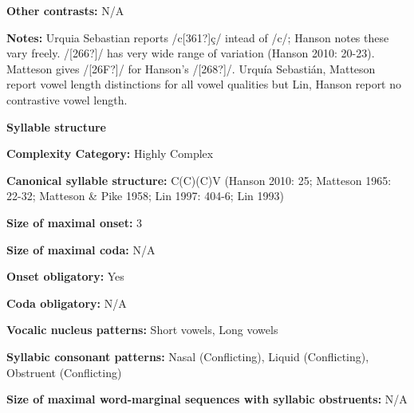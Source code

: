 \begin{styleBody}
\textbf{Other contrasts:} N/A
\end{styleBody}

\begin{styleBody}
\textbf{Notes:} Urquia Sebastian reports /c[361?]ç/ intead of /c/; Hanson notes these vary freely. /[266?]/ has very wide range of variation (Hanson 2010: 20-23). Matteson gives /[26F?]/ for Hanson’s /[268?]/. Urquía Sebastián, Matteson report vowel length distinctions for all vowel qualities but Lin, Hanson report no contrastive vowel length.
\end{styleBody}

\begin{styleBody}
\textbf{Syllable structure}
\end{styleBody}

\begin{styleBody}
\textbf{Complexity Category:} Highly Complex
\end{styleBody}

\begin{styleBody}
\textbf{Canonical syllable structure:} C(C)(C)V\textbf{ }(Hanson 2010: 25; Matteson 1965: 22-32; Matteson \& Pike 1958; Lin 1997: 404-6; Lin 1993)
\end{styleBody}

\begin{styleBody}
\textbf{Size of maximal onset:} 3
\end{styleBody}

\begin{styleBody}
\textbf{Size of maximal coda:} N/A
\end{styleBody}

\begin{styleBody}
\textbf{Onset obligatory:} Yes
\end{styleBody}

\begin{styleBody}
\textbf{Coda obligatory:} N/A
\end{styleBody}

\begin{styleBody}
\textbf{Vocalic nucleus patterns:} Short vowels, Long vowels
\end{styleBody}

\begin{styleBody}
\textbf{Syllabic consonant patterns:} Nasal (Conflicting), Liquid (Conflicting), Obstruent (Conflicting)
\end{styleBody}

\begin{styleBody}
\textbf{Size of maximal word{}-marginal sequences with syllabic obstruents:} N/A
\end{styleBody}


